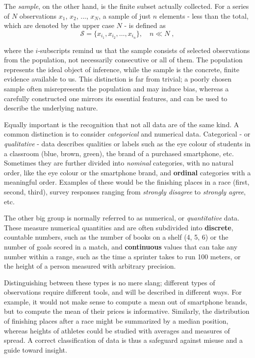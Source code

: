 \documentclass{book}
\begin{document}
The \textit{sample}, on the other hand, is the finite subset actually collected. For a series of $N$ observations $x_1$, $x_2$, ..., $x_N$, a sample of just $n$ elements - less than the total, which are denoted by the upper case $N$ - is defined as
\begin{equation}
	\mathcal{S} = \{x_{i_1}, x_{i_2}, \dots, x_{i_n}\}, \quad n \ll N \; ,
\end{equation}

where the $i$-subscripts remind us that the sample consists of selected observations from the population, not necessarily consecutive or all of them. The population represents the ideal object of inference, while the sample is the concrete, finite evidence available to us. This distinction is far from trivial; a poorly chosen sample often misrepresents the population and may induce bias, whereas a carefully constructed one mirrors its essential features, and can be used to describe the underlying nature.

\medskip

Equally important is the recognition that not all data are of the same kind. A common distinction is to  consider \textit{categorical} and {numerical} data. Categorical - or \textit{qualitative} -  data describes qualities or labels such as the eye colour of students in a classroom (blue, brown, green), the brand of a purchased smartphone, etc. Sometimes they are further divided into \textit{nominal} categories, with no natural order, like the eye colour or the smartphone brand, and \textbf{ordinal} categories with a meaningful order. Examples of these would be the finishing places in a race (first, second, third), survey responses ranging from \textit{strongly disagree} to \textit{strongly agree}, etc.

\medskip

The other big group is normally referred to as numerical, or \textit{quantitative} data. These measure numerical quantities and are often subdivided into \textbf{discrete}, countable numbers, such as the number of books on a shelf (4, 5, 6) or the number of goals scored in a match, and \textbf{continuous} values that can take any number within a range, such as the time a sprinter takes to run 100 meters, or the height of a person measured with arbitrary precision.

\medskip

Distinguishing between these types is no mere slang; different types of observations require different tools, and will be described in different ways. For example, it would not make sense to compute a mean out of smartphone brands, but to compute the mean of their prices is informative. Similarly, the distribution of finishing places after a race might be summarized by a median position, whereas heights of athletes could be studied with averages and measures of spread. A correct classification of data is thus a safeguard against misuse and a guide toward insight.
\end{document}
